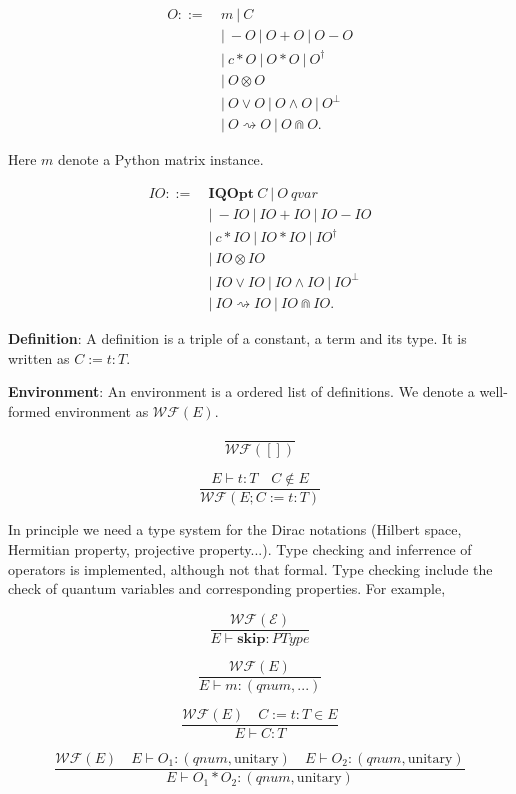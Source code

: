 \documentclass{article}
\begin{document}
$$
\begin{aligned}
    O ::=\ & m\ |\ C\ \\
        & |\ - O\ |\ O + O\ |\ O - O\\
        & |\ c * O\ |\ O * O\ |\ O^\dagger \\
        & |\ O \otimes O\ \\
        & |\ O \vee O\ |\ O \wedge O\ |\ O ^\bot \\
        & |\ O \rightsquigarrow O\ |\ O \Cap O.
\end{aligned}
$$

Here $m$ denote a Python matrix instance.

$$
\begin{aligned}
    IO ::=\ &\textbf{IQOpt}\ C\ |\ O\ qvar \\
        & |\ - IO\ |\ IO + IO\ |\ IO - IO\\
        & |\ c * IO\ |\ IO * IO\ |\ IO^\dagger \\
        & |\ IO \otimes IO\ \\
        & |\ IO \vee IO\ |\ IO \wedge IO\ |\ IO ^\bot \\
        & |\ IO \rightsquigarrow IO\ |\ IO \Cap IO.
\end{aligned}
$$

\textbf{Definition}: A definition is a triple of a constant, a term and its type. It is written as $C := t : T$.

\textbf{Environment}: An environment is a ordered list of definitions. We denote a well-formed environment as $\mathcal{WF}(E)$.

$$
\frac{}{\mathcal{WF}([])}
$$

$$
\frac{E \vdash t : T\quad C \notin E}{\mathcal{WF}(E; C := t : T)}
$$



In principle we need a type system for the Dirac notations (Hilbert space, Hermitian property, projective property...).
Type checking and inferrence of operators is implemented, although not that formal. Type checking include the check of quantum variables and corresponding properties.
For example,

$$
\frac{\mathcal{WF(E)}}{E \vdash \mathbf{skip} : PType}
$$

$$
\frac{\mathcal{WF}(E)}{E \vdash m : (qnum, ...)}
$$

$$
\frac{\mathcal{WF}(E)\quad C:=t:T \in E}{E \vdash C : T}
$$

$$
\frac{\mathcal{WF}(E)\quad E \vdash O_1 : (qnum, \text{unitary}) \quad E \vdash O_2 : (qnum, \text{unitary})}{E \vdash O_1 * O_2 : (qnum, \text{unitary})}
$$
\end{document}
